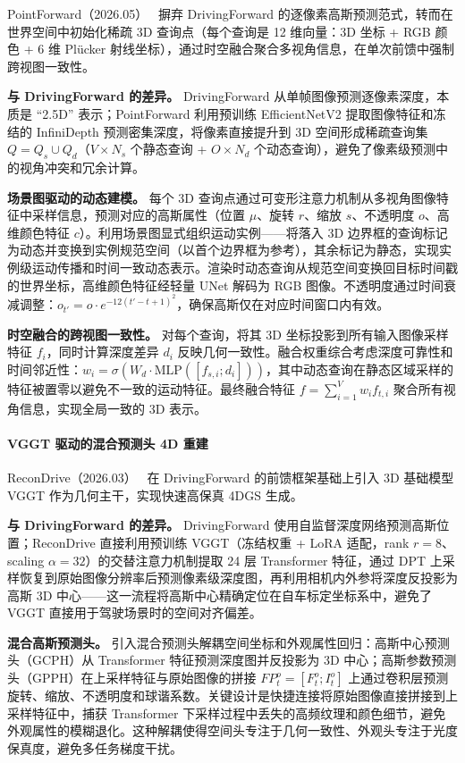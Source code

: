 PointForward（2026.05）~\cite{2605_11594} 摒弃 DrivingForward 的逐像素高斯预测范式，转而在世界空间中初始化稀疏 3D 查询点（每个查询是 12 维向量：3D 坐标 + RGB 颜色 + 6 维 Pl\"ucker 射线坐标），通过时空融合聚合多视角信息，在单次前馈中强制跨视图一致性。

\textbf{与 DrivingForward 的差异。} DrivingForward 从单帧图像预测逐像素深度，本质是 ``2.5D'' 表示；PointForward 利用预训练 EfficientNetV2 提取图像特征和冻结的 InfiniDepth 预测密集深度，将像素直接提升到 3D 空间形成稀疏查询集 $Q = Q_s \cup Q_d$（$V \times N_s$ 个静态查询 + $O \times N_d$ 个动态查询），避免了像素级预测中的视角冲突和冗余计算。

\textbf{场景图驱动的动态建模。} 每个 3D 查询点通过可变形注意力机制从多视角图像特征中采样信息，预测对应的高斯属性（位置 $\mu$、旋转 $r$、缩放 $s$、不透明度 $o$、高维颜色特征 $c$）。利用场景图显式组织运动实例——将落入 3D 边界框的查询标记为动态并变换到实例规范空间（以首个边界框为参考），其余标记为静态，实现实例级运动传播和时间一致动态表示。渲染时动态查询从规范空间变换回目标时间戳的世界坐标，高维颜色特征经轻量 UNet 解码为 RGB 图像。不透明度通过时间衰减调整：$o_{t'} = o \cdot e^{-12(t'-t+1)^2}$，确保高斯仅在对应时间窗口内有效。

\textbf{时空融合的跨视图一致性。} 对每个查询，将其 3D 坐标投影到所有输入图像采样特征 $f_i$，同时计算深度差异 $d_i$ 反映几何一致性。融合权重综合考虑深度可靠性和时间邻近性：$w_i = \sigma(W_d \cdot \text{MLP}([f_{s,i}; d_i]))$，其中动态查询在静态区域采样的特征被置零以避免不一致的运动特征。最终融合特征 $f = \sum_{i=1}^{V} w_i f_{t,i}$ 聚合所有视角信息，实现全局一致的 3D 表示。

\paragraph{VGGT 驱动的混合预测头 4D 重建}

ReconDrive（2026.03）~\cite{2603_07552} 在 DrivingForward 的前馈框架基础上引入 3D 基础模型 VGGT 作为几何主干，实现快速高保真 4DGS 生成。

\textbf{与 DrivingForward 的差异。} DrivingForward 使用自监督深度网络预测高斯位置；ReconDrive 直接利用预训练 VGGT（冻结权重 + LoRA 适配，rank $r{=}8$、scaling $\alpha{=}32$）的交替注意力机制提取 24 层 Transformer 特征，通过 DPT 上采样恢复到原始图像分辨率后预测像素级深度图，再利用相机内外参将深度反投影为高斯 3D 中心——这一流程将高斯中心精确定位在自车标定坐标系中，避免了 VGGT 直接用于驾驶场景时的空间对齐偏差。

\textbf{混合高斯预测头。} 引入混合预测头解耦空间坐标和外观属性回归：高斯中心预测头（GCPH）从 Transformer 特征预测深度图并反投影为 3D 中心；高斯参数预测头（GPPH）在上采样特征与原始图像的拼接 $FP_t^o = [F_t^o; I_t^o]$ 上通过卷积层预测旋转、缩放、不透明度和球谐系数。关键设计是快捷连接将原始图像直接拼接到上采样特征中，捕获 Transformer 下采样过程中丢失的高频纹理和颜色细节，避免外观属性的模糊退化。这种解耦使得空间头专注于几何一致性、外观头专注于光度保真度，避免多任务梯度干扰。

